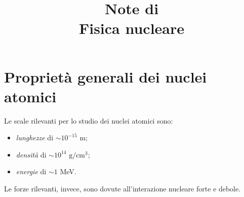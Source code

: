\documentclass[11pt, a4paper]{scrartcl}
\title{Note di\\ \vspace{.15cm} Fisica nucleare}
\author{}
\date{}
\theoremstyle{style}
\renewcommand{\maketitle}{
\begin{center}
{\sffamily
{\fontsize{20}{20}\selectfont\MakeUppercase\thetitle}}

\vspace{0.2in}

{\large\scshape\sffamily\theauthor}
\end{center}
}
\numberwithin{equation}{subsection}
\begin{document}
\maketitle
\newpage
\tableofcontents 
\newpage
\section{Propriet\`a generali dei nuclei atomici}
Le scale rilevanti per lo studio dei nuclei atomici sono:
\begin{itemize}
	\item \textit{lunghezze} di $\sim 10^{-15}$ m;
	\item \textit{densit\`a} di $\sim 10^{14}\text{ g}/\text{cm}^3$;
	\item \textit{energie} di $\sim 1$ MeV.
\end{itemize}
Le forze rilevanti, invece, sono dovute all'interazione nucleare forte e debole.
\end{document}
